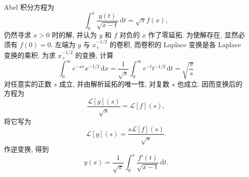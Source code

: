 \begin{Example}
\label{ex:abel-integral-equation-laplace}
Abel 积分方程为
\begin{equation}\label{eq:abel-integral-equation}
\int_0^x\dfrac{y(t)}{\sqrt{x-t}}\,\mathrm{d}t=\sqrt\pi f(x),
\end{equation}
仍然寻求 $x>0$ 时的解, 并认为 $y$ 和 $f$ 对负的 $x$ 作了零延拓. 为使解存在, 显然必须有 $f(0)=0$. 左端为 $y$ 与 $x_+^{-1/2}$ 的卷积, 而卷积的 Laplace 变换是各 Laplace 变换的乘积. 为求 $x_+^{-1/2}$ 的变换, 计算
\begin{equation}\label{eq:laplace-inverse-square-root-kernel}
\int_0^\infty e^{-sx}x^{-1/2}\,\mathrm{d}x=\dfrac1{\sqrt s}\int_0^\infty e^{-t}t^{-1/2}\,\mathrm{d}t=\sqrt{\dfrac\pi s}
\end{equation}
对任意实的正数 $s$ 成立, 并由解析延拓的唯一性, 对复数 $s$ 也成立. 因而变换后的方程为
\begin{equation}\label{eq:abel-equation-laplace-transform}
\dfrac{\mathcal{L}[y](s)}{\sqrt s}=\mathcal{L}[f](s),
\end{equation}
将它写为
\begin{equation}\label{eq:abel-equation-transform-solution}
\mathcal{L}[y](s)=\dfrac{s\mathcal{L}[f](s)}{\sqrt s}.
\end{equation}
作逆变换, 得到
\begin{equation}\label{eq:abel-equation-inverse-transform-solution}
y(x)=\dfrac1{\sqrt\pi}\int_0^x\dfrac{f'(t)}{\sqrt{x-t}}\,\mathrm{d}t.
\end{equation}

\end{Example}

